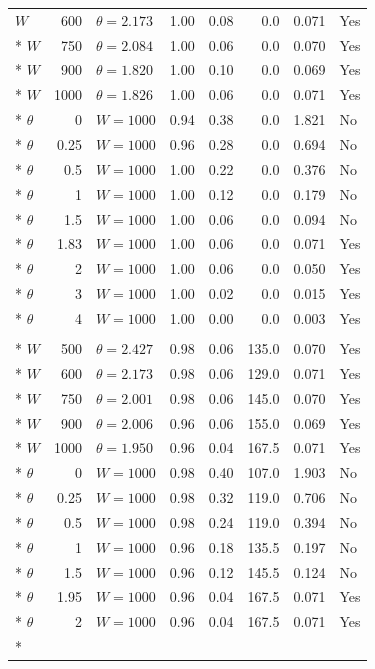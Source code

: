 \documentclass[preprint,12pt]{elsarticle}
\begin{document}
\begin{longtable}{lrlrrrrl}
$W$ & 600 & $\theta=2.173$ & 1.00 & 0.08 & 0.0 & 0.071 & Yes\\*
$W$ & 750 & $\theta=2.084$ & 1.00 & 0.06 & 0.0 & 0.070 & Yes\\*
$W$ & 900 & $\theta=1.820$ & 1.00 & 0.10 & 0.0 & 0.069 & Yes\\*
$W$ & 1000 & $\theta=1.826$ & 1.00 & 0.06 & 0.0 & 0.071 & Yes\\*
$\theta$ & 0 & $W=1000$ & 0.94 & 0.38 & 0.0 & 1.821 & No\\*
$\theta$ & 0.25 & $W=1000$ & 0.96 & 0.28 & 0.0 & 0.694 & No\\*
$\theta$ & 0.5 & $W=1000$ & 1.00 & 0.22 & 0.0 & 0.376 & No\\*
$\theta$ & 1 & $W=1000$ & 1.00 & 0.12 & 0.0 & 0.179 & No\\*
$\theta$ & 1.5 & $W=1000$ & 1.00 & 0.06 & 0.0 & 0.094 & No\\*
$\theta$ & 1.83 & $W=1000$ & 1.00 & 0.06 & 0.0 & 0.071 & Yes\\*
$\theta$ & 2 & $W=1000$ & 1.00 & 0.06 & 0.0 & 0.050 & Yes\\*
$\theta$ & 3 & $W=1000$ & 1.00 & 0.02 & 0.0 & 0.015 & Yes\\*
$\theta$ & 4 & $W=1000$ & 1.00 & 0.00 & 0.0 & 0.003 & Yes\\
\addlinespace
\multicolumn{8}{l}{\textit{Local abrupt (LEA)}}\\*
$W$ & 500 & $\theta=2.427$ & 0.98 & 0.06 & 135.0 & 0.070 & Yes\\*
$W$ & 600 & $\theta=2.173$ & 0.98 & 0.06 & 129.0 & 0.071 & Yes\\*
$W$ & 750 & $\theta=2.001$ & 0.98 & 0.06 & 145.0 & 0.070 & Yes\\*
$W$ & 900 & $\theta=2.006$ & 0.96 & 0.06 & 155.0 & 0.069 & Yes\\*
$W$ & 1000 & $\theta=1.950$ & 0.96 & 0.04 & 167.5 & 0.071 & Yes\\*
$\theta$ & 0 & $W=1000$ & 0.98 & 0.40 & 107.0 & 1.903 & No\\*
$\theta$ & 0.25 & $W=1000$ & 0.98 & 0.32 & 119.0 & 0.706 & No\\*
$\theta$ & 0.5 & $W=1000$ & 0.98 & 0.24 & 119.0 & 0.394 & No\\*
$\theta$ & 1 & $W=1000$ & 0.96 & 0.18 & 135.5 & 0.197 & No\\*
$\theta$ & 1.5 & $W=1000$ & 0.96 & 0.12 & 145.5 & 0.124 & No\\*
$\theta$ & 1.95 & $W=1000$ & 0.96 & 0.04 & 167.5 & 0.071 & Yes\\*
$\theta$ & 2 & $W=1000$ & 0.96 & 0.04 & 167.5 & 0.071 & Yes\\*

\end{longtable}
\end{document}
